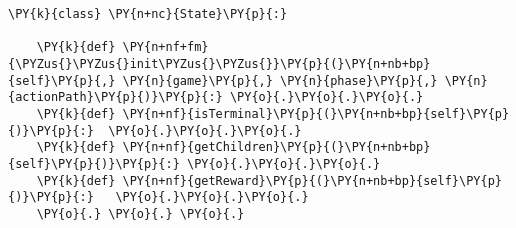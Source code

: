 \begin{Verbatim}[commandchars=\\\{\}]
\PY{k}{class} \PY{n+nc}{State}\PY{p}{:}

    \PY{k}{def} \PY{n+nf+fm}{\PYZus{}\PYZus{}init\PYZus{}\PYZus{}}\PY{p}{(}\PY{n+nb+bp}{self}\PY{p}{,} \PY{n}{game}\PY{p}{,} \PY{n}{phase}\PY{p}{,} \PY{n}{actionPath}\PY{p}{)}\PY{p}{:} \PY{o}{.}\PY{o}{.}\PY{o}{.}
    \PY{k}{def} \PY{n+nf}{isTerminal}\PY{p}{(}\PY{n+nb+bp}{self}\PY{p}{)}\PY{p}{:}  \PY{o}{.}\PY{o}{.}\PY{o}{.}
    \PY{k}{def} \PY{n+nf}{getChildren}\PY{p}{(}\PY{n+nb+bp}{self}\PY{p}{)}\PY{p}{:} \PY{o}{.}\PY{o}{.}\PY{o}{.}
    \PY{k}{def} \PY{n+nf}{getReward}\PY{p}{(}\PY{n+nb+bp}{self}\PY{p}{)}\PY{p}{:}   \PY{o}{.}\PY{o}{.}\PY{o}{.}
    \PY{o}{.} \PY{o}{.} \PY{o}{.}
\end{Verbatim}
